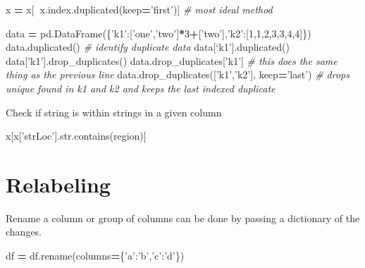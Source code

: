 \documentclass[]{book}
\newenvironment{Shaded}{\begin{snugshade}}{\end{snugshade}}
\newcommand{\BuiltInTok}[1]{#1}
\newcommand{\CommentTok}[1]{\textcolor[rgb]{0.56,0.35,0.01}{\textit{#1}}}
\newcommand{\DecValTok}[1]{\textcolor[rgb]{0.00,0.00,0.81}{#1}}
\newcommand{\NormalTok}[1]{#1}
\newcommand{\OperatorTok}[1]{\textcolor[rgb]{0.81,0.36,0.00}{\textbf{#1}}}
\newcommand{\StringTok}[1]{\textcolor[rgb]{0.31,0.60,0.02}{#1}}
\begin{document}
\begin{Shaded}
\begin{Highlighting}[]
\NormalTok{x }\OperatorTok{=}\NormalTok{ x[}\OperatorTok{~}\NormalTok{x.index.duplicated(keep}\OperatorTok{=}\StringTok{'first'}\NormalTok{)] }\CommentTok{# most ideal method}

\NormalTok{data }\OperatorTok{=}\NormalTok{ pd.DataFrame(\{}\StringTok{'k1'}\NormalTok{:[}\StringTok{'one'}\NormalTok{,}\StringTok{'two'}\NormalTok{]}\OperatorTok{*}\DecValTok{3}\OperatorTok{+}\NormalTok{[}\StringTok{'two'}\NormalTok{],}\StringTok{'k2'}\NormalTok{:[}\DecValTok{1}\NormalTok{,}\DecValTok{1}\NormalTok{,}\DecValTok{2}\NormalTok{,}\DecValTok{3}\NormalTok{,}\DecValTok{3}\NormalTok{,}\DecValTok{4}\NormalTok{,}\DecValTok{4}\NormalTok{]\})}
\NormalTok{data.duplicated() }\CommentTok{# identify duplicate data}
\NormalTok{data[‘k1’].duplicated()}
\NormalTok{data[}\StringTok{'k1'}\NormalTok{].drop_duplicates()}
\NormalTok{data.drop_duplicates[}\StringTok{'k1'}\NormalTok{] }\CommentTok{# this does the same thing as the previous line}
\NormalTok{data.drop_duplicates([}\StringTok{'k1'}\NormalTok{,}\StringTok{'k2'}\NormalTok{], keep}\OperatorTok{=}\StringTok{'last'}\NormalTok{) }\CommentTok{# drops unique found in k1 and k2 and keeps the last indexed duplicate}
\end{Highlighting}
\end{Shaded}

Check if string is within strings in a given column

\begin{Shaded}
\begin{Highlighting}[]
\NormalTok{x[x[}\StringTok{'strLoc'}\NormalTok{].}\BuiltInTok{str}\NormalTok{.contains(region)]}
\end{Highlighting}
\end{Shaded}

\hypertarget{relabeling}{%
\section{Relabeling}\label{relabeling}}

Rename a column or group of columns can be done by passing a dictionary of the changes.

\begin{Shaded}
\begin{Highlighting}[]
\NormalTok{    df }\OperatorTok{=}\NormalTok{ df.rename(columns}\OperatorTok{=}\NormalTok{\{}\StringTok{'a'}\NormalTok{:}\StringTok{'b'}\NormalTok{,}\StringTok{'c'}\NormalTok{:}\StringTok{'d'}\NormalTok{\})}
\end{Highlighting}
\end{Shaded}
\end{document}
